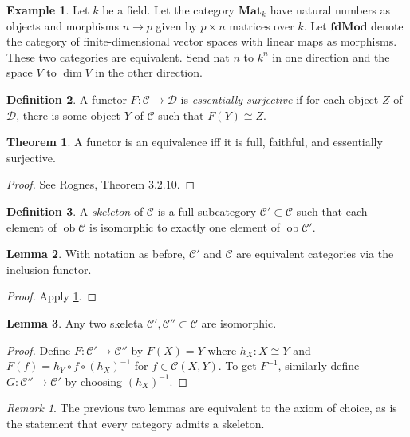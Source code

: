 \documentclass[10pt,letterpaper,cm]{nupset}
\theoremstyle{definition}
\newtheorem{definition}{Definition}
\newtheorem{exmp}[definition]{Example}
\theoremstyle{theorem}
\newtheorem{theorem}{Theorem}
\newtheorem{lemma}[theorem]{Lemma}
\theoremstyle{remark}
\newtheorem{remark}{Remark}
\newcommand{\1}{\mathbf{1}}
\renewcommand{\c}{\mathscr{C}}
\renewcommand{\d}{\mathscr{D}}
\newcommand{\0}{\vec 0}
\DeclareMathOperator{\ob}{ob}
\begin{document}
\begin{exmp}
Let $k$ be a field. Let the category $\mathbf{Mat}_k$  have natural numbers as objects and morphisms $n \to p$ given by $p \times n$ matrices over $k$. Let $\mathbf{fdMod}$ denote the category of finite-dimensional vector spaces with linear maps as morphisms. These two categories are equivalent. Send nat $n$ to $k^n$ in one direction and the space $V$ to $\dim V$ in the other direction.    
\end{exmp}

\begin{definition}
A functor $F : \c \to \d$ is \textit{essentially surjective} if for each object $Z$ of  $\d$, there is some object $Y$ of $\c$ such that $F(Y) \cong Z$.
\end{definition}

\begin{theorem}\label{equiv}
A functor is an equivalence iff it is full, faithful, and essentially surjective. 
\end{theorem}
\begin{proof}
See Rognes, Theorem 3.2.10.
\end{proof}

\begin{definition}
A \textit{skeleton} of $\c$ is a full subcategory $\c' \subset \c$ such that each element of $\ob \c$ is isomorphic to exactly one element of $\ob \c'$.
\end{definition}

\begin{lemma}
With notation as before, $\c'$ and $\c$ are equivalent categories via the inclusion functor.
\end{lemma}
\begin{proof}
Apply \cref{equiv}.
\end{proof}

\begin{lemma}
Any two skeleta $\c', \c'' \subset \c$ are isomorphic.
\end{lemma}
\begin{proof}
Define $F: \c' \to \c''$ by $F(X) =Y$ where $h_X: X \cong Y$ and $F(f) = h_Y \circ f \circ (h_X)^{{-}1}$ for $f\in \c(X, Y)$. 
To get $F^{{-}1}$, similarly define $G: \c'' \to \c'$ by choosing $(h_X)^{{-}1}$.
\end{proof}

\begin{remark}
The previous two lemmas are equivalent to the axiom of choice, as is the statement that every category admits a skeleton.
\end{remark}
\end{document}
